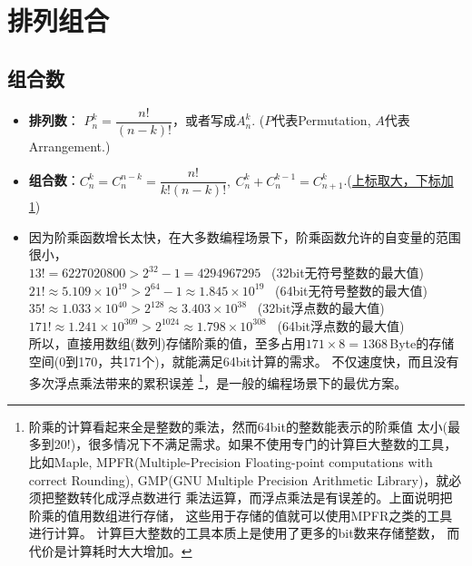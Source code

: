 \chapter{排列组合}

\section{组合数}
\begin{itemize}[leftmargin=\inteval{\myitemleftmargin}pt,itemsep=
   \inteval{\myitemitempsep}pt,topsep=\inteval{\myitemtopsep}pt]
   
\item \textbf{排列数}：
$ P_n^k=\dfrac{n!}{(n-k)!} $，或者写成$ A_n^k $. 
($P$代表Permutation, $A$代表Arrangement.) 

\item \textbf{组合数}：$ C_n^k=C_n^{n-k}=\dfrac{n!}{k!(n-k)!},\ 
C_n^k+C_n^{k-1}=C_{n+1}^k $.(\underline{上标取大，下标加1})

\item 因为阶乘函数增长太快，在大多数编程场景下，阶乘函数允许的自变量的范围很小，\\
$ 13! = 6227020800 >2^{32}-1 = 4294967295$ \ (32bit无符号整数的最大值)  \\
$ 21!\approx 5.109\times 10^{19} >2^{64}-1 \approx  1.845\times 10^{19}$ 
\ (64bit无符号整数的最大值)   \\
$ 35!\approx 1.033\times 10^{40} >2^{128} \approx  3.403\times 10^{38}$ 
\ (32bit浮点数的最大值)  \\
$ 171!\approx 1.241\times 10^{309} >2^{1024} \approx  1.798\times 10^{308}$ 
\ (64bit浮点数的最大值)  \\
所以，直接用数组(数列)存储阶乘的值，至多占用$ 171\times 8 = 1368 $\,Byte的存储空间(0到170，共171个)，就能满足64bit计算的需求。
不仅速度快，而且没有多次浮点乘法带来的累积误差
\footnote{阶乘的计算看起来全是整数的乘法，然而64bit的整数能表示的阶乘值
太小(最多到20!)，很多情况下不满足需求。如果不使用专门的计算巨大整数的工具，比如Maple, MPFR(Multiple-Precision Floating-point computations with correct Rounding), GMP(GNU Multiple Precision Arithmetic Library)，就必须把整数转化成浮点数进行
乘法运算，而浮点乘法是有误差的。上面说明把阶乘的值用数组进行存储，
这些用于存储的值就可以使用MPFR之类的工具进行计算。
计算巨大整数的工具本质上是使用了更多的bit数来存储整数，
而代价是计算耗时大大增加。}，是一般的编程场景下的最优方案。


\end{itemize}
